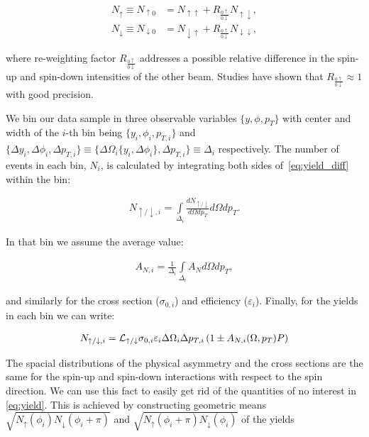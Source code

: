 \documentclass[12pt]{article}
\begin{document}
\begin{align}
N_{\uparrow}   \equiv N_{\uparrow0}   &= N_{\uparrow\uparrow}   + R_{\frac{0\uparrow}{0\downarrow}} N_{\uparrow\downarrow},\\
N_{\downarrow} \equiv N_{\downarrow0} &= N_{\downarrow\uparrow} + R_{\frac{0\uparrow}{0\downarrow}} N_{\downarrow\downarrow},
\end{align}

\noindent
where re-weighting factor $R_{\frac{0\uparrow}{0\downarrow}}$ addresses a
possible relative difference in the spin-up and spin-down intensities of the
other beam. Studies have shown that $R_{\frac{0\uparrow}{0\downarrow}} \approx
1$ with good precision.

We bin our data sample in three observable variables $\{y, \phi, p_T\}$ with
center and width of the $i$-th bin being $\{y_i, \phi_i, p_{T,i}\}$ and
$\{\Delta y_i, \Delta\phi_i, \Delta p_{T,i}\} \equiv \{\Delta\Omega_i\{y_i,
\Delta\phi_i\}, \Delta p_{T,i}\} \equiv \Delta_i$ respectively. The number of
events in each bin, $N_i$, is calculated by integrating both sides
of~\eqref{eq:yield_diff} within the bin:

\begin{align}
N_{\uparrow/\downarrow, i} =
   \int\limits_{\Delta_i} \frac{dN_{\uparrow/\downarrow}}{d\Omega dp_T} d\Omega dp_T.
\end{align}

\noindent
In that bin we assume the average value:

\begin{align}
A_{N,i} = \frac{1}{\Delta_i} \int\limits_{\Delta_i} A_N d\Omega dp_T,
\end{align}

\noindent
and similarly for the cross section ($\sigma_{0,i}$) and efficiency
($\varepsilon_i$). Finally, for the yields in each bin we can write:

\begin{align}
N_{\uparrow/\downarrow, i} = {\cal L}_{\uparrow/\downarrow} \sigma_{0,i}
\varepsilon_i \Delta\Omega_i \Delta p_{T,i} \left( 1 \pm A_{N,i}(\Omega, p_T) P \right)
\label{eq:yield}
\end{align}

The spacial distributions of the physical asymmetry and the cross sections are
the same for the spin-up and spin-down interactions with respect to the spin
direction. We can use this fact to easily get rid of the  quantities of no
interest in \eqref{eq:yield}. This is achieved by constructing geometric
means $\sqrt{N_\uparrow(\phi_i)N_\downarrow(\phi_i+\pi)}$ and
$\sqrt{N_\uparrow(\phi_i+\pi)N_\downarrow(\phi_i)}$ of the yields
\end{document}
